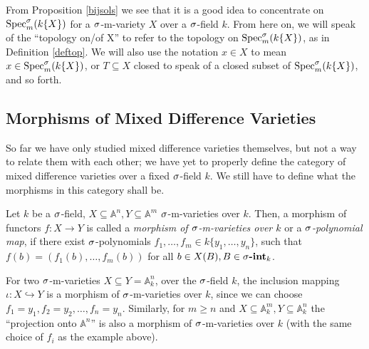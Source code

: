 From Proposition \ref{bijsols} we see that it is a good idea to concentrate on $\operatorname{Spec}^\sigma_m(k\{X\})$ for a $\sigma$-m-variety $X$ over a $\sigma$-field $k$.
 From here on, we will speak of the ``topology on/of X'' to refer to the topology on $\operatorname{Spec}^\sigma_m(k\{X\})$, as in Definition \ref{deftop}. 
We will also use the notation $x \in X$ to mean $x \in \operatorname{Spec}^\sigma_m(k\{X\})$, or $T \subseteq X$ closed to speak of a closed subset of $\operatorname{Spec}^\sigma_m(k\{X\})$, and so forth.

\subsection{Morphisms of Mixed Difference Varieties}

So far we have only studied mixed difference varieties themselves, but not a way to relate them with each other; we have yet to properly define the category of mixed difference varieties over a fixed $\sigma$-field $k$. 
We still have to define what the morphisms in this category shall be.

\begin{defn}\label{spolynomialmaps}
Let $k$ be a $\sigma$-field, $X \subseteq \mathbb{A}^n,Y \subseteq \mathbb{A}^m$ $\sigma$-m-varieties over $k$. Then, a morphism of functors $f: X \rightarrow Y$ is called a \emph{morphism of $\sigma$-m-varieties over $k$} or a \emph{$\sigma$-polynomial map},
if there exist $\sigma$-polynomials $f_1,\ldots,f_m \in k\{y_1,\ldots,y_n\}$, such that $f(b) = (f_1(b),\ldots,f_m(b))$ for all $b \in X(B), B \in \sigma\text{{\normalfont\textbf{-int}}}_k$.  
 
\end{defn}

\begin{ex}
For two $\sigma$-m-varieties $X \subseteq Y = \mathbb{A}^n_k$, over the $\sigma$-field $k$, the inclusion mapping $\iota: X \hookrightarrow Y$ is a morphism of $\sigma$-m-varieties over $k$, since we can choose $f_1 = y_1, f_2 = y_2, \ldots, f_n = y_n$.
Similarly, for $m \geq n$ and $X \subseteq \mathbb{A}^m_k, Y \subseteq \mathbb{A}^n_k$ the ``projection onto $\mathbb{A}^n$'' is also a morphism of $\sigma$-m-varieties over $k$ (with the same choice of $f_i$ as the example above).
\end{ex}

